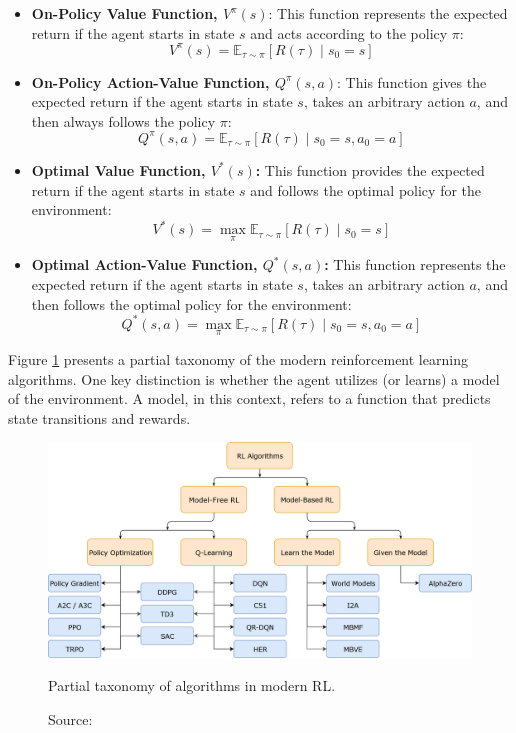 \begin{itemize}
    \item \textbf{On-Policy Value Function, \( V^{\pi}(s) \)}: This function
    represents the expected return if the agent starts in state \( s \)
    and acts according to the policy \( \pi \):
    $$ V^{\pi}(s) = \mathbb{E}_{\tau \sim \pi} \left[ R(\tau) \mid s_0 = s \right] $$
    \item \textbf{On-Policy Action-Value Function, \( Q^{\pi}(s,a) \)}:
    This function gives the expected return if the agent starts in state \( s \),
    takes an arbitrary action \( a \), and then always follows the policy \( \pi \):
    $$ Q^{\pi}(s,a) = \mathbb{E}_{\tau \sim \pi} \left[ R(\tau) \mid s_0 = s, a_0 = a \right] $$
    \item \textbf{Optimal Value Function, \( V^*(s) \):} This function provides
    the expected return if the agent starts in state \( s \) and follows the
    optimal policy for the environment:
    $$ V^*(s) = \max_{\pi} \mathbb{E}_{\tau \sim \pi} \left[ R(\tau) \mid s_0 = s \right] $$
    \item \textbf{Optimal Action-Value Function, \( Q^*(s,a) \):} This function
    represents the expected return if the agent starts in state \( s \),
    takes an arbitrary action \( a \), and then follows the optimal policy for the environment:
    $$ Q^*(s,a) = \max_{\pi} \mathbb{E}_{\tau \sim \pi} \left[ R(\tau) \mid s_0 = s, a_0 = a \right] $$
\end{itemize}

Figure \ref{fig:mdp}
presents a partial taxonomy of the modern reinforcement learning algorithms.
One key distinction is whether the agent utilizes (or learns) a model of
the environment. A model, in this context, refers to a function that predicts
state transitions and rewards.

\begin{figure}[h]
    \centering
    \includegraphics[width=.8\textwidth]{figures/ch3/4.rlalg.png}
    \caption{Partial taxonomy of algorithms in modern RL.}
    \vspace{-10px}
    \caption*{\scriptsize{Source: \cite{openaiPartKinds}}}
    \label{fig:mdp}
\end{figure}

